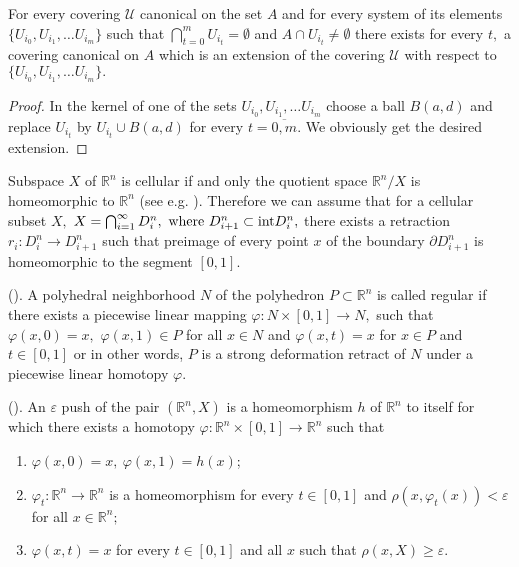 \begin{lmm}\label{extension}
For every covering $\mathcal{U}$ canonical on the set $A$ and for
every system of its elements $\{U_{i_0}, U_{i_1},\dots U_{i_m}\}$
such that $\bigcap_{t=0}^{m}U_{i_t} = \emptyset$ and $A\cap
U_{i_t}\neq \emptyset$ there exists for every $t,$ a covering
canonical on $A$ which is an extension of the covering
$\mathcal{U}$ with respect to $\{U_{i_0}, U_{i_1},\dots
U_{i_m}\}.$
\end{lmm}

\begin{proof}
In the kernel of one of the sets $U_{i_0}, U_{i_1},\dots U_{i_m}$
choose a ball $B(a, d)$ and replace $U_{i_t}$ by $U_{i_t}\cup B(a,
d)$ for every $t =\overline{0,m}.$ We obviously get the desired
extension.
\end{proof}

Subspace $X$ of $\mathbb{R}^n$ is cellular if and only the
quotient space $\mathbb{R}^n/X$ is homeomorphic to $\mathbb{R}^n$
(see  e.g. \cite{GS}). Therefore we can assume that for a
cellular subset $X,$ $X = \bigcap_{i=1}^{\infty}D^n_i, \
\mbox{where} \ D^n_{i+1} \subset {\rm int} D^n_i,$ there exists a
retraction $r_i: D^n_{i} \to D^n_{i+1}$  such that preimage of
every point $x$ of the boundary $\partial D^n_{i+1}$ is
homeomorphic to the segment $[0, 1].$

\begin{dfn} {\rm (}\cite{GS, H}{\rm )}. A polyhedral neighborhood $N$ of the polyhedron $P \subset
\mathbb{R}^n$  is called {\rm regular} if there exists a piecewise
linear mapping $\varphi: N\times [0, 1] \to N,$ such that
$\varphi(x, 0) = x,$  $\varphi(x, 1)\in P $ for all $x\in N$ and
$\varphi(x, t) = x$ for $x\in P$ and $t\in [0,1]$ or in other
words, $P$ is a strong deformation retract of $N$ under a
piecewise linear homotopy $\varphi.$
\end{dfn}

\begin{dfn} {\rm (}\cite{GS, H}{\rm )}. An {\rm $\varepsilon$ push of the pair $(\mathbb{R}^n, X)$}
is a homeomorphism $h$ of $\mathbb{R}^n$ to itself for which there
exists a homotopy $\varphi: \mathbb{R}^n\times [0,1]\to
\mathbb{R}^n$ such that
\begin{enumerate}
    \item $\varphi(x,0) = x,\ \varphi(x,1) = h(x)$;
    \item $\varphi_t:\mathbb{R}^n \to \mathbb{R}^n$ is a homeomorphism for every $t\in
    [0,1]$ and $\rho(x, \varphi_t(x) )< \varepsilon$ for all $x\in
    \mathbb{R}^n;$
    \item $\varphi(x,t) = x$ for every $t\in [0, 1]$ and all $x$
    such that $\rho(x, X) \geq \varepsilon.$
\end{enumerate}
\end{dfn}

